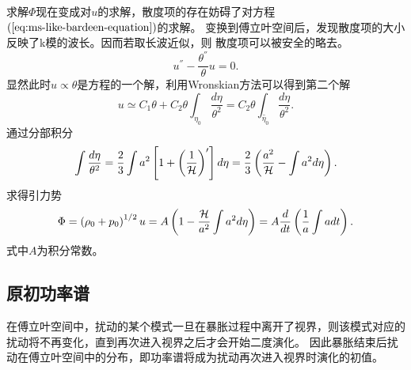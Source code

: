 求解$\Phi$现在变成对$u$的求解，散度项的存在妨碍了对方程$(\ref{eq:ms-like-bardeen-equation})$的求解。
变换到傅立叶空间后，发现散度项的大小反映了k模的波长。因而若取长波近似，则
散度项可以被安全的略去。
\begin{equation}
  u^{\dprime} - \frac{\theta^{\dprime}}{\theta} u =0. 
\end{equation}
显然此时$u\propto \theta$是方程的一个解，利用Wronskian方法可以得到第二个解
\begin{equation}
  u\simeq C_1\theta +C_2\theta \int_{\eta_0}\frac{d\eta}{\theta^2}
  =C_2\theta \int_{\tilde{\eta_0}}\frac{d\eta}{\theta^2}.
\end{equation}
通过分部积分
\begin{equation}
  \int \frac{d\eta}{\theta^2}=
  \frac{2}{3}\int a^2\left[1+\left(\frac{1}{\mathcal{H}}\right)^{\prime}\right]d\eta
  =\frac{2}{3}\left(\frac{a^2}{\mathcal{H}}-\int a^2d\eta\right).
\end{equation}
求得引力势
\begin{equation}
  \Phi=\left(\rho_0+p_0\right)^{1 /2}u
  = A\left(1-\frac{\mathcal{H}}{a^2}\int a^2d\eta\right)
  = A \frac{d}{dt}\left(\frac{1}{a}\int adt\right).
\end{equation}
式中$A$为积分常数。

\subsection{原初功率谱}
在傅立叶空间中，扰动的某个模式一旦在暴胀过程中离开了视界，则该模式对应的扰动将不再变化，直到再次进入视界之后才会开始二度演化。
因此暴胀结束后扰动在傅立叶空间中的分布，即功率谱将成为扰动再次进入视界时演化的初值。

